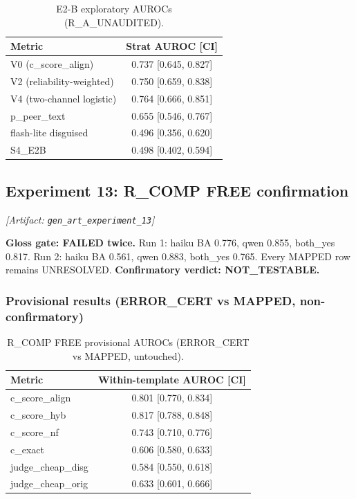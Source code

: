 \documentclass[11pt,letterpaper]{article}
\begin{document}
\begin{table}[!htbp]
\centering
\caption{E2-B exploratory AUROCs (R\_A\_UNAUDITED).}
\label{tab:e2b_exploratory}
\begin{tabular}{lc}
\toprule
Metric & Strat AUROC [CI] \\
\midrule
V0 (c\_score\_align) & 0.737 [0.645, 0.827] \\
V2 (reliability-weighted) & 0.750 [0.659, 0.838] \\
V4 (two-channel logistic) & 0.764 [0.666, 0.851] \\
p\_peer\_text & 0.655 [0.546, 0.767] \\
flash-lite disguised & 0.496 [0.356, 0.620] \\
S4\_E2B & 0.498 [0.402, 0.594] \\
\bottomrule
\end{tabular}
\end{table}

\subsection{Experiment 13: R\_COMP FREE confirmation}
\label{sec:exp13}
\noindent\textit{[Artifact: \texttt{gen\_art\_experiment\_13}]}

\textbf{Gloss gate: FAILED twice.} Run 1: haiku BA 0.776, qwen 0.855, both\_yes 0.817. Run 2: haiku BA 0.561, qwen 0.883, both\_yes 0.765. Every MAPPED row remains UNRESOLVED. \textbf{Confirmatory verdict: NOT\_TESTABLE.}

\subsubsection{Provisional results (ERROR\_CERT vs MAPPED, non-confirmatory)}

\begin{table}[!htbp]
\centering
\caption{R\_COMP FREE provisional AUROCs (ERROR\_CERT vs MAPPED, untouched).}
\label{tab:rcomp_free}
\begin{tabular}{lc}
\toprule
Metric & Within-template AUROC [CI] \\
\midrule
c\_score\_align & 0.801 [0.770, 0.834] \\
c\_score\_hyb & 0.817 [0.788, 0.848] \\
c\_score\_nf & 0.743 [0.710, 0.776] \\
c\_exact & 0.606 [0.580, 0.633] \\
judge\_cheap\_disg & 0.584 [0.550, 0.618] \\
judge\_cheap\_orig & 0.633 [0.601, 0.666] \\
\bottomrule
\end{tabular}
\end{table}
\end{document}
